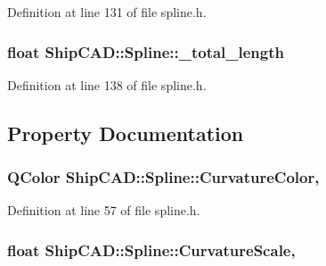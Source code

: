 Definition at line 131 of file spline.\-h.

\hypertarget{classShipCAD_1_1Spline_ae9e5a60e0a8722d9a3cd483f6019e4e9}{
\subsubsection[{\-\_\-total\-\_\-length}]{\setlength{\rightskip}{0pt plus 5cm}float Ship\-C\-A\-D\-::\-Spline\-::\-\_\-total\-\_\-length\hspace{0.3cm}{\ttfamily [protected]}}}\label{classShipCAD_1_1Spline_ae9e5a60e0a8722d9a3cd483f6019e4e9}


Definition at line 138 of file spline.\-h.



\subsection{Property Documentation}
\hypertarget{classShipCAD_1_1Spline_ac5268eaa6aadac5db072c7fdeb578ed4}{
\subsubsection[{Curvature\-Color}]{\setlength{\rightskip}{0pt plus 5cm}Q\-Color Ship\-C\-A\-D\-::\-Spline\-::\-Curvature\-Color\hspace{0.3cm}{\ttfamily [read]}, {\ttfamily [write]}}}\label{classShipCAD_1_1Spline_ac5268eaa6aadac5db072c7fdeb578ed4}


Definition at line 57 of file spline.\-h.

\hypertarget{classShipCAD_1_1Spline_a5e8a93a4b5d164f38773e7edbf7753b3}{
\subsubsection[{Curvature\-Scale}]{\setlength{\rightskip}{0pt plus 5cm}float Ship\-C\-A\-D\-::\-Spline\-::\-Curvature\-Scale\hspace{0.3cm}{\ttfamily [read]}, {\ttfamily [write]}}}\label{classShipCAD_1_1Spline_a5e8a93a4b5d164f38773e7edbf7753b3}


